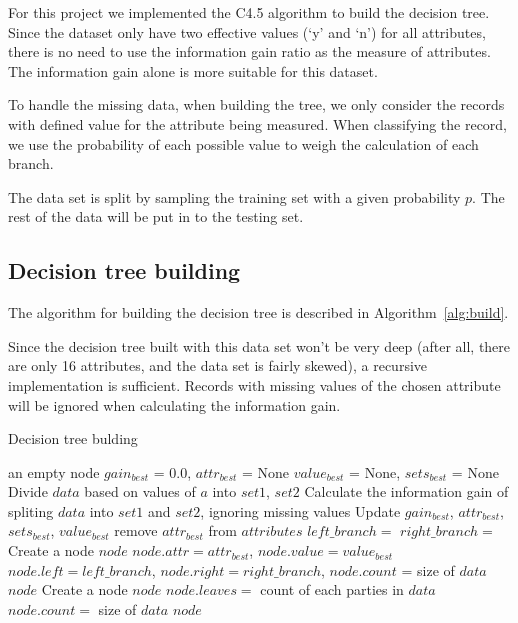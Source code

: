 \documentclass{article}
\begin{document}
For this project we implemented the C4.5 algorithm to build the decision tree. Since the dataset only have two effective values (`y' and `n') for all attributes, there is no need to use the information gain ratio as the measure of attributes. The information gain alone is more suitable for this dataset.

To handle the missing data, when building the tree, we only consider the records with defined value for the attribute being measured. When classifying the record, we use the probability of each possible value to weigh the calculation of each branch.

The data set is split by sampling the training set with a given probability $p$. The rest of the data will be put in to the testing set.

\subsection{Decision tree building}

The algorithm for building the decision tree is described in Algorithm~\ref{alg:build}.

Since the decision tree built with this data set won't be very deep (after all, there are only 16 attributes, and the data set is fairly skewed), a recursive implementation is sufficient. Records with missing values of the chosen attribute will be ignored when calculating the information gain.

\begin{algorithm}[H]
\centering
\caption{Decision tree bulding}
\label{alg:build}
  \begin{algorithmic}[1]
        	\State \Return an empty node
        \EndIf
        \State $gain_{best}$ = 0.0, $attr_{best}$ = None
        \State $value_{best}$ = None, $sets_{best}$ = None
    		\State Divide $data$ based on values of $a$ into $set1$, $set2$
    		\State Calculate the information gain of spliting $data$ into $set1$ and $set2$, ignoring missing values
    			\State Update $gain_{best}$, $attr_{best}$, $sets_{best}$, $value_{best}$
    		\EndIf
	    \EndFor
	    	\State remove $attr_{best}$ from $attributes$
	    	\State $left\_branch =$ 
	    	\State $right\_branch =$ 
	    	\State Create a node $node$
	    	\State $node.attr = attr_{best}$, $node.value = value_{best}$
	    	\State $node.left = left\_branch$, $node.right = right\_branch$, $node.count$ = size of $data$
	    	\State \Return $node$
      	\Else
      		\State Create a node $node$
      		\State $node.leaves = $ count of each parties in $data$
      		\State $node.count = $ size of $data$
      		\State \Return $node$
      	\EndIf
    \EndFunction
  \end{algorithmic}
\end{algorithm}
\end{document}
